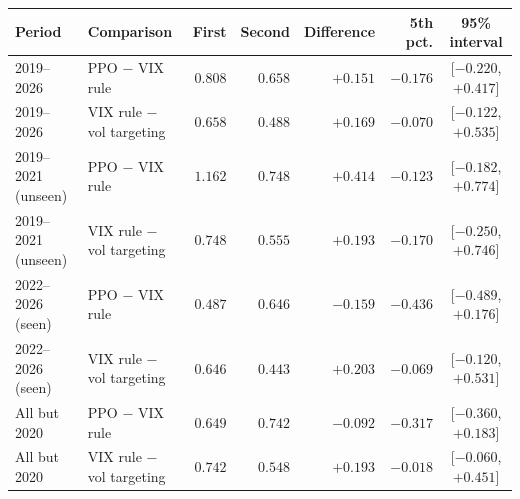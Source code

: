 \begin{tabular}{llrrrrc}
\toprule
Period & Comparison & First & Second & Difference & 5th pct. & 95\% interval \\
\midrule
2019--2026 & PPO $-$ VIX rule & $0.808$ & $0.658$ & $+0.151$ & $-0.176$ & [$-0.220$, $+0.417$] \\
2019--2026 & VIX rule $-$ vol targeting & $0.658$ & $0.488$ & $+0.169$ & $-0.070$ & [$-0.122$, $+0.535$] \\
2019--2021 (unseen) & PPO $-$ VIX rule & $1.162$ & $0.748$ & $+0.414$ & $-0.123$ & [$-0.182$, $+0.774$] \\
2019--2021 (unseen) & VIX rule $-$ vol targeting & $0.748$ & $0.555$ & $+0.193$ & $-0.170$ & [$-0.250$, $+0.746$] \\
2022--2026 (seen) & PPO $-$ VIX rule & $0.487$ & $0.646$ & $-0.159$ & $-0.436$ & [$-0.489$, $+0.176$] \\
2022--2026 (seen) & VIX rule $-$ vol targeting & $0.646$ & $0.443$ & $+0.203$ & $-0.069$ & [$-0.120$, $+0.531$] \\
All but 2020 & PPO $-$ VIX rule & $0.649$ & $0.742$ & $-0.092$ & $-0.317$ & [$-0.360$, $+0.183$] \\
All but 2020 & VIX rule $-$ vol targeting & $0.742$ & $0.548$ & $+0.193$ & $-0.018$ & [$-0.060$, $+0.451$] \\
\bottomrule
\end{tabular}

